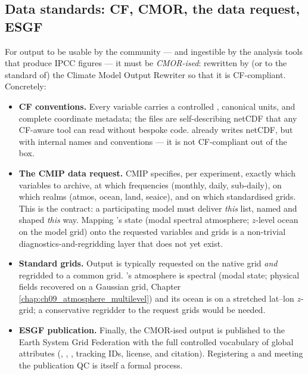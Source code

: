 \subsection{Data standards: CF, CMOR, the data request, ESGF}\label{sec:c20_data}

For output to be usable by the community --- and ingestible by the analysis tools
that produce IPCC figures --- it must be \emph{CMOR-ised}: rewritten by (or to the
standard of) the Climate Model Output Rewriter so that it is CF-compliant.
Concretely:

\begin{itemize}[leftmargin=1.5em]
\item \textbf{CF conventions.} Every variable carries a controlled
  , canonical units, and complete coordinate metadata; the
  files are self-describing netCDF that any CF-aware tool can read without bespoke
  code. \model{} already writes netCDF, but with internal names and conventions
  --- it is not CF-compliant out of the box.
\item \textbf{The CMIP data request.} CMIP specifies, per experiment, exactly which
  variables to archive, at which frequencies (monthly, daily, sub-daily), on which
  realms (atmos, ocean, land, seaice), and on which standardised grids. This is the
  contract: a participating model must deliver \emph{this} list, named and shaped
  \emph{this} way. Mapping \model{}'s state (modal spectral atmosphere; $z$-level
  ocean on the model grid) onto the requested variables and grids is a non-trivial
  diagnostics-and-regridding layer that does not yet exist.
\item \textbf{Standard grids.} Output is typically requested on the native grid
  \emph{and} regridded to a common grid. \model{}'s atmosphere is spectral (modal
  state; physical fields recovered on a Gaussian grid, Chapter~%
  \ref{chap:ch09_atmosphere_multilevel}) and its ocean is on a stretched
  lat--lon $z$-grid; a conservative regridder to the request grids would be needed.
\item \textbf{ESGF publication.} Finally, the CMOR-ised output is published to the
  Earth System Grid Federation with the full controlled vocabulary of global
  attributes (, , ,
  tracking IDs, license, and citation). Registering a  and meeting
  the publication QC is itself a formal process.
\end{itemize}

